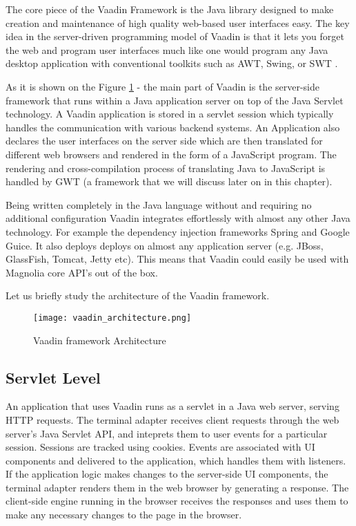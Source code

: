 The core piece of the Vaadin Framework is the Java library designed to make
creation and maintenance of high quality web-based user interfaces easy. The key
idea in the server-driven programming model of Vaadin is that it lets you forget
the web and program user interfaces much like one would program any Java desktop
application with conventional toolkits such as AWT, Swing, or SWT \cite{BoV}.

As it is shown on the Figure \ref{fig:vaadin_arch} - the main part of Vaadin is
the server-side framework that runs within a Java application server on top of
the Java Servlet technology. A Vaadin application is stored in a servlet session
which typically handles the communication with various backend systems. An
Application also declares the user interfaces on the server side which are then
translated for different web browsers and rendered in the form of a JavaScript
program. The rendering and cross-compilation process of translating Java to
JavaScript is handled by GWT (a framework that we will discuss later on in this
chapter).

Being written completely in the Java language without and requiring no
additional configuration Vaadin integrates effortlessly with almost any other
Java technology. For example the dependency injection frameworks 
Spring and Google Guice. It also deploys deploys on almost any application server (e.g. JBoss,
GlassFish, Tomcat, Jetty etc). This means that Vaadin could easily be used with
Magnolia core API's out of the box.

Let us briefly study the architecture of the Vaadin framework.
\begin{figure}[H]
\begin{center}
  \texttt{[image: vaadin\_architecture.png]}
  \caption[labelInTOC]{Vaadin framework Architecture}
  \label{fig:vaadin_arch}
\end{center}
\end{figure}
 
\subsection{Servlet Level} 
An application that uses Vaadin runs as a servlet in a
Java web server, serving HTTP requests. The terminal adapter receives client
requests through the web server's Java Servlet API, and inteprets them to user
events for a particular session. Sessions are tracked using cookies. Events are
associated with UI components and delivered to the application, which handles
them with listeners. If the application logic makes changes to the server-side
UI components, the terminal adapter renders them in the web browser by
generating a response. The client-side engine running in the browser receives
the responses and uses them to make any necessary changes to the page in the
browser.

